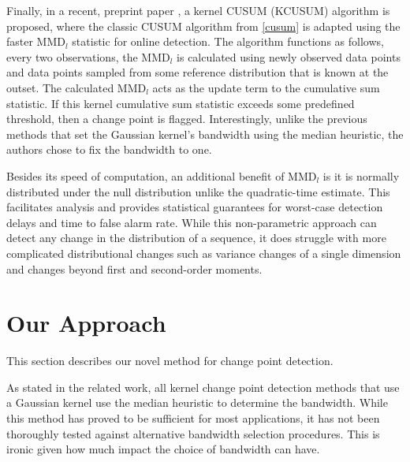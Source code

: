 Finally, in a recent, preprint paper \cite{flynn2019change}, a kernel CUSUM (KCUSUM) algorithm is proposed, where the classic CUSUM algorithm from \ref{cusum} is adapted using the faster MMD$_l$ statistic for online detection. The algorithm functions as follows, every two observations, the MMD$_l$ is calculated using newly observed data points and data points sampled from some reference distribution that is known at the outset. The calculated MMD$_l$ acts as the update term to the cumulative sum statistic. If this kernel cumulative sum statistic exceeds some predefined threshold, then a change point is flagged. Interestingly, unlike the previous methods that set the Gaussian kernel's bandwidth using the median heuristic, the authors chose to fix the bandwidth to one. %

Besides its speed of computation, an additional benefit of MMD$_l$ is it is normally distributed under the null distribution unlike the quadratic-time estimate. This facilitates analysis and provides statistical guarantees for worst-case detection delays and time to false alarm rate. While this non-parametric approach can detect any change in the distribution of a sequence, it does struggle with more complicated distributional changes such as variance changes of a single dimension and changes beyond first and second-order moments.


\section{Our Approach}

This section describes our novel method for change point detection.

As stated in the related work, all kernel change point detection methods that use a Gaussian kernel use the median heuristic to determine the bandwidth. While this method has proved to be sufficient for most applications, it has not been thoroughly tested against alternative bandwidth selection procedures. This is ironic given how much impact the choice of bandwidth can have.

